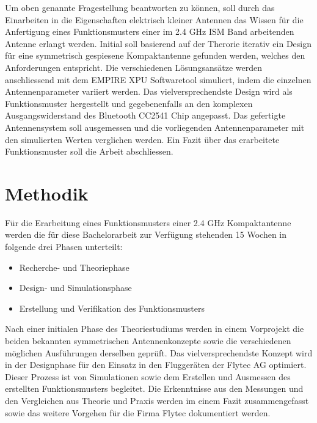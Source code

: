 Um oben genannte Fragestellung beantworten zu können, soll durch das Einarbeiten in die Eigenschaften elektrisch kleiner Antennen das Wissen für die Anfertigung eines Funktionsmusters einer im 2.4 GHz ISM Band arbeitenden Antenne erlangt werden. Initial soll basierend auf der Therorie iterativ ein Design für eine symmetrisch gespiesene Kompaktantenne gefunden werden, welches den Anforderungen entspricht. Die verschiedenen Lösungsansätze werden anschliessend mit dem EMPIRE XPU Softwaretool simuliert, indem die einzelnen Antennenparameter variiert werden. Das vielversprechendste Design wird als Funktionsmuster hergestellt und gegebenenfalls an den komplexen Ausgangswiderstand des Bluetooth CC2541 Chip angepasst. Das gefertigte Antennensystem soll ausgemessen und die vorliegenden Antennenparameter mit den simulierten Werten verglichen werden. Ein Fazit über das erarbeitete Funktionsmuster soll die Arbeit abschliessen.

\section{Methodik}
Für die Erarbeitung eines Funktionsmusters einer 2.4 GHz Kompaktantenne werden die für diese \mbox{Bachelorarbeit} zur Verfügung stehenden 15 Wochen in folgende drei Phasen unterteilt: 
\begin{itemize}
	\item Recherche- und Theoriephase
	\item Design- und Simulationsphase 
	\item  Erstellung und Verifikation des Funktionsmusters
\end{itemize}
Nach einer initialen Phase des Theoriestudiums werden in einem Vorprojekt die beiden bekannten symmetrischen Antennenkonzepte sowie die verschiedenen möglichen Ausführungen derselben geprüft. Das vielversprechendste Konzept wird in der Designphase für den Einsatz in den Fluggeräten der Flytec AG optimiert. Dieser Prozess ist von Simulationen sowie dem  Erstellen und Ausmessen des erstellten Funktionsmusters begleitet. Die Erkenntnisse aus den Messungen und den Vergleichen aus Theorie und Praxis werden im einem Fazit zusammengefasst sowie das weitere Vorgehen für die Firma Flytec dokumentiert werden.



